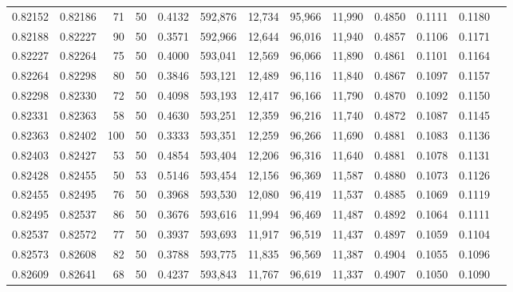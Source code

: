 \begin{tabular}{rrrrrrrrrrrrr}
0.82152 & 0.82186 &    71 &  50 &                                     0.4132 & 592,876 &  12,734 &  95,966 &  11,990 & 0.4850 & 0.1111 & 0.1180 \\
0.82188 & 0.82227 &    90 &  50 &                                     0.3571 & 592,966 &  12,644 &  96,016 &  11,940 & 0.4857 & 0.1106 & 0.1171 \\
0.82227 & 0.82264 &    75 &  50 &                                     0.4000 & 593,041 &  12,569 &  96,066 &  11,890 & 0.4861 & 0.1101 & 0.1164 \\
0.82264 & 0.82298 &    80 &  50 &                                     0.3846 & 593,121 &  12,489 &  96,116 &  11,840 & 0.4867 & 0.1097 & 0.1157 \\
0.82298 & 0.82330 &    72 &  50 &                                     0.4098 & 593,193 &  12,417 &  96,166 &  11,790 & 0.4870 & 0.1092 & 0.1150 \\
0.82331 & 0.82363 &    58 &  50 &                                     0.4630 & 593,251 &  12,359 &  96,216 &  11,740 & 0.4872 & 0.1087 & 0.1145 \\
0.82363 & 0.82402 &   100 &  50 &                                     0.3333 & 593,351 &  12,259 &  96,266 &  11,690 & 0.4881 & 0.1083 & 0.1136 \\
0.82403 & 0.82427 &    53 &  50 &                                     0.4854 & 593,404 &  12,206 &  96,316 &  11,640 & 0.4881 & 0.1078 & 0.1131 \\
0.82428 & 0.82455 &    50 &  53 &                                     0.5146 & 593,454 &  12,156 &  96,369 &  11,587 & 0.4880 & 0.1073 & 0.1126 \\
0.82455 & 0.82495 &    76 &  50 &                                     0.3968 & 593,530 &  12,080 &  96,419 &  11,537 & 0.4885 & 0.1069 & 0.1119 \\
0.82495 & 0.82537 &    86 &  50 &                                     0.3676 & 593,616 &  11,994 &  96,469 &  11,487 & 0.4892 & 0.1064 & 0.1111 \\
0.82537 & 0.82572 &    77 &  50 &                                     0.3937 & 593,693 &  11,917 &  96,519 &  11,437 & 0.4897 & 0.1059 & 0.1104 \\
0.82573 & 0.82608 &    82 &  50 &                                     0.3788 & 593,775 &  11,835 &  96,569 &  11,387 & 0.4904 & 0.1055 & 0.1096 \\
0.82609 & 0.82641 &    68 &  50 &                                     0.4237 & 593,843 &  11,767 &  96,619 &  11,337 & 0.4907 & 0.1050 & 0.1090 \\

\end{tabular}

